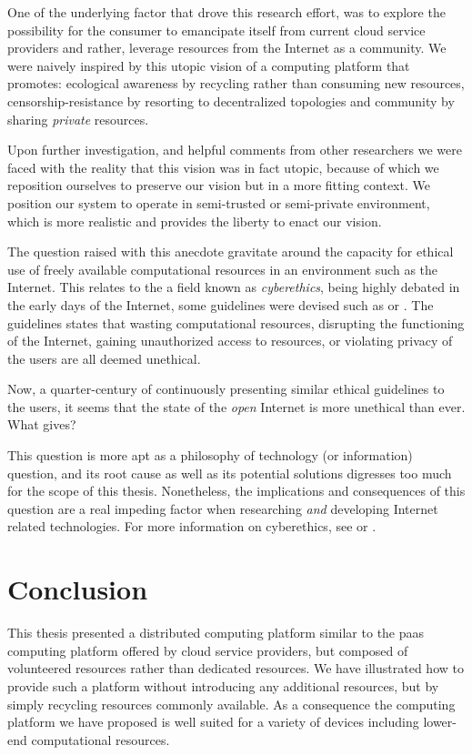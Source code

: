 \documentclass[12pt, titlepage]{uo_temp}
\begin{document}
     One of the underlying factor that drove this research effort, was to explore the
     possibility for the consumer to emancipate itself from current cloud service
     providers and rather, leverage resources from the Internet as a community.
     We were naively inspired by this utopic vision of a computing platform that promotes:
     ecological awareness by recycling rather than consuming new resources,
     censorship-resistance by resorting to decentralized topologies and community by
     sharing \emph{private} resources.

     Upon further investigation, and helpful comments from other researchers we were faced
     with the reality that this vision was in fact utopic, because of which we reposition
     ourselves to preserve our vision but in a more fitting context. We position
     our system to operate in semi-trusted or semi-private environment, which is more
     realistic and provides the liberty to enact our vision.

     The question raised with this anecdote gravitate around the capacity for ethical use
     of freely available computational resources in an environment such as the
     Internet. This relates to the a field known as \emph{cyberethics}, being highly
     debated in the early days of the Internet, some guidelines were devised such as
     \cite{ethics1989rfc} or \cite{barquin1992pursuit}. The guidelines states that wasting
     computational resources, disrupting the functioning of the Internet, gaining
     unauthorized access to resources, or violating privacy of the users are all deemed
     unethical.

     Now, a quarter-century of continuously presenting similar ethical guidelines to the
     users, it seems that the state of the \emph{open} Internet is more unethical than
     ever. What gives?

     This question is more apt as a philosophy of technology (or information) question,
     and its root cause as well as its potential solutions digresses too much for the scope
     of this thesis. Nonetheless, the implications and consequences of this question are a
     real impeding factor when researching \emph{and} developing Internet related
     technologies. For more information on cyberethics, see \cite{spinello2010cyberethics}
     or \cite{tavani2010ethics}.

     \chapter{Conclusion}
     This thesis presented a distributed computing platform similar to the \gls{paas}
     computing platform offered by cloud service providers, but composed of volunteered
     resources rather than dedicated resources. We have illustrated how to provide such a
     platform without introducing any additional resources, but by simply recycling
     resources commonly available. As a consequence the computing platform we have
     proposed is well suited for a variety of devices including lower-end computational
     resources.
\end{document}
